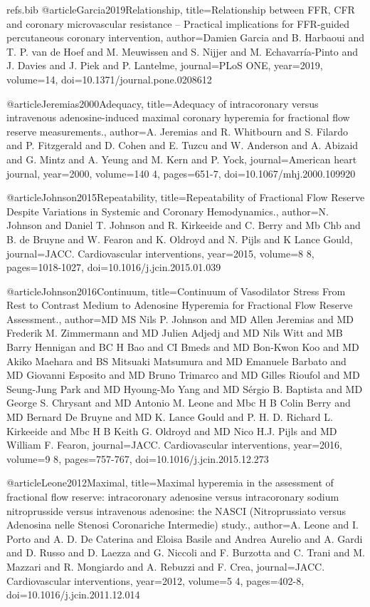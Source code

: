 \begin{filecontents}{refs.bib}
@article{Garcia2019Relationship,
title={Relationship between FFR, CFR and coronary microvascular resistance – Practical implications for FFR-guided percutaneous coronary intervention},
author={Damien Garcia and B. Harbaoui and T. P. van de Hoef and M. Meuwissen and S. Nijjer and M. Echavarría-Pinto and J. Davies and J. Piek and P. Lantelme},
journal={PLoS ONE},
year={2019},
volume={14},
doi={10.1371/journal.pone.0208612}
}

@article{Jeremias2000Adequacy,
title={Adequacy of intracoronary versus intravenous adenosine-induced maximal coronary hyperemia for fractional flow reserve measurements.},
author={A. Jeremias and R. Whitbourn and S. Filardo and P. Fitzgerald and D. Cohen and E. Tuzcu and W. Anderson and A. Abizaid and G. Mintz and A. Yeung and M. Kern and P. Yock},
journal={American heart journal},
year={2000},
volume={140 4},
pages={651-7},
doi={10.1067/mhj.2000.109920}
}

@article{Johnson2015Repeatability,
title={Repeatability of Fractional Flow Reserve Despite Variations in Systemic and Coronary Hemodynamics.},
author={N. Johnson and Daniel T. Johnson and R. Kirkeeide and C. Berry and Mb Chb and B. de Bruyne and W. Fearon and K. Oldroyd and N. Pijls and K Lance Gould},
journal={JACC. Cardiovascular interventions},
year={2015},
volume={8 8},
pages={1018-1027},
doi={10.1016/j.jcin.2015.01.039}
}

@article{Johnson2016Continuum,
title={Continuum of Vasodilator Stress From Rest to Contrast Medium to Adenosine Hyperemia for Fractional Flow Reserve Assessment.},
author={MD MS Nils P. Johnson and MD Allen Jeremias and MD Frederik M. Zimmermann and MD Julien Adjedj and MD Nils Witt and MB Barry Hennigan and BC H Bao and CI Bmeds and MD Bon-Kwon Koo and MD Akiko Maehara and BS Mitsuaki Matsumura and MD Emanuele Barbato and MD Giovanni Esposito and MD Bruno Trimarco and MD Gilles Rioufol and MD Seung-Jung Park and MD Hyoung-Mo Yang and MD Sérgio B. Baptista and MD George S. Chrysant and MD Antonio M. Leone and Mbc H B Colin Berry and MD Bernard De Bruyne and MD K. Lance Gould and P. H. D. Richard L. Kirkeeide and Mbc H B Keith G. Oldroyd and MD Nico H.J. Pijls and MD William F. Fearon},
journal={JACC. Cardiovascular interventions},
year={2016},
volume={9 8},
pages={757-767},
doi={10.1016/j.jcin.2015.12.273}
}

@article{Leone2012Maximal,
title={Maximal hyperemia in the assessment of fractional flow reserve: intracoronary adenosine versus intracoronary sodium nitroprusside versus intravenous adenosine: the NASCI (Nitroprussiato versus Adenosina nelle Stenosi Coronariche Intermedie) study.},
author={A. Leone and I. Porto and A. D. De Caterina and Eloisa Basile and Andrea Aurelio and A. Gardi and D. Russo and D. Laezza and G. Niccoli and F. Burzotta and C. Trani and M. Mazzari and R. Mongiardo and A. Rebuzzi and F. Crea},
journal={JACC. Cardiovascular interventions},
year={2012},
volume={5 4},
pages={402-8},
doi={10.1016/j.jcin.2011.12.014}
}


\end{filecontents}
